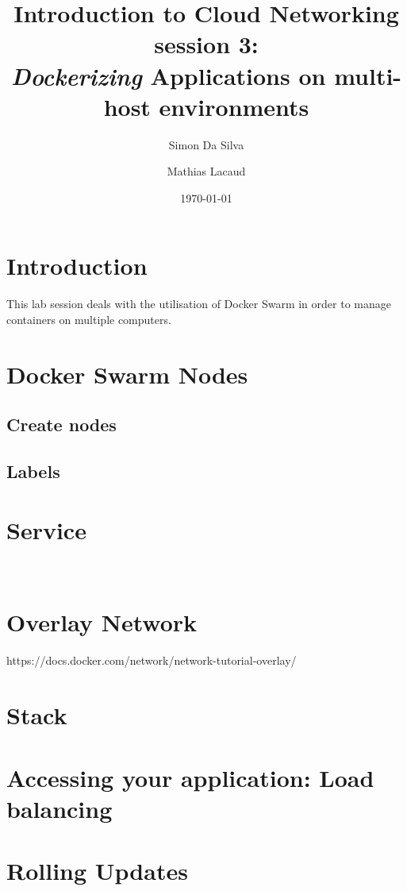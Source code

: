 \documentclass[a4paper,11pt]{exam}
\date{\today}
\title{Introduction to Cloud Networking session 3: \\
\textit{Dockerizing} Applications on multi-host environments}
\author{Simon Da Silva \and Mathias Lacaud}
\begin{document}
	
		
	
\maketitle

\section{Introduction}
This lab session deals with the utilisation of Docker Swarm in order to manage containers on multiple computers.

\section{Docker Swarm Nodes}
\subsection{Create nodes}


\subsection{Labels}

\section{Service}


\begin{lstlisting}[frame=single,language={sh}]  % Start your code-block



\end{lstlisting}

\section{Overlay Network} 

https://docs.docker.com/network/network-tutorial-overlay/

\section{Stack}

\section{Accessing your application: Load balancing}

\section{Rolling Updates}
\end{document}
